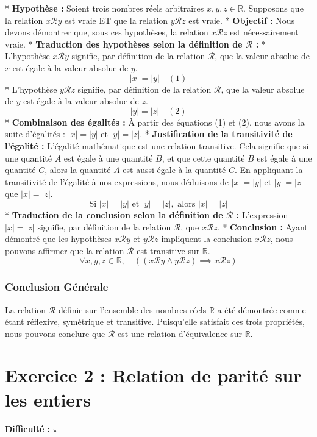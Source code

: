 \documentclass{report}
\begin{document}
*   \textbf{Hypothèse :} Soient trois nombres réels arbitraires $x, y, z \in \mathbb{R}$. Supposons que la relation $x \mathcal{R} y$ est vraie ET que la relation $y \mathcal{R} z$ est vraie.
*   \textbf{Objectif :} Nous devons démontrer que, sous ces hypothèses, la relation $x \mathcal{R} z$ est nécessairement vraie.
*   \textbf{Traduction des hypothèses selon la définition de $\mathcal{R}$ :}
    *   L'hypothèse $x \mathcal{R} y$ signifie, par définition de la relation $\mathcal{R}$, que la valeur absolue de $x$ est égale à la valeur absolue de $y$.
        $$ |x| = |y| \quad (1) $$
    *   L'hypothèse $y \mathcal{R} z$ signifie, par définition de la relation $\mathcal{R}$, que la valeur absolue de $y$ est égale à la valeur absolue de $z$.
        $$ |y| = |z| \quad (2) $$
*   \textbf{Combinaison des égalités :} À partir des équations (1) et (2), nous avons la suite d'égalités : $|x| = |y|$ et $|y| = |z|$.
*   \textbf{Justification de la transitivité de l'égalité :} L'égalité mathématique est une relation transitive. Cela signifie que si une quantité $A$ est égale à une quantité $B$, et que cette quantité $B$ est égale à une quantité $C$, alors la quantité $A$ est aussi égale à la quantité $C$. En appliquant la transitivité de l'égalité à nos expressions, nous déduisons de $|x| = |y|$ et $|y| = |z|$ que $|x| = |z|$.
    $$ \text{Si } |x| = |y| \text{ et } |y| = |z|, \text{ alors } |x| = |z| $$
*   \textbf{Traduction de la conclusion selon la définition de $\mathcal{R}$ :} L'expression $|x| = |z|$ signifie, par définition de la relation $\mathcal{R}$, que $x \mathcal{R} z$.
*   \textbf{Conclusion :} Ayant démontré que les hypothèses $x \mathcal{R} y$ et $y \mathcal{R} z$ impliquent la conclusion $x \mathcal{R} z$, nous pouvons affirmer que la relation $\mathcal{R}$ est transitive sur $\mathbb{R}$.
    $$ \forall x, y, z \in \mathbb{R}, \quad ((x \mathcal{R} y \land y \mathcal{R} z) \implies x \mathcal{R} z) $$

\subsection*{Conclusion Générale}
La relation $\mathcal{R}$ définie sur l'ensemble des nombres réels $\mathbb{R}$ a été démontrée comme étant réflexive, symétrique et transitive. Puisqu'elle satisfait ces trois propriétés, nous pouvons conclure que $\mathcal{R}$ est une relation d'équivalence sur $\mathbb{R}$.
\newpage
\chapter*{Exercice 2 : Relation de parité sur les entiers}
\textbf{Difficulté :} $\star$
\end{document}
